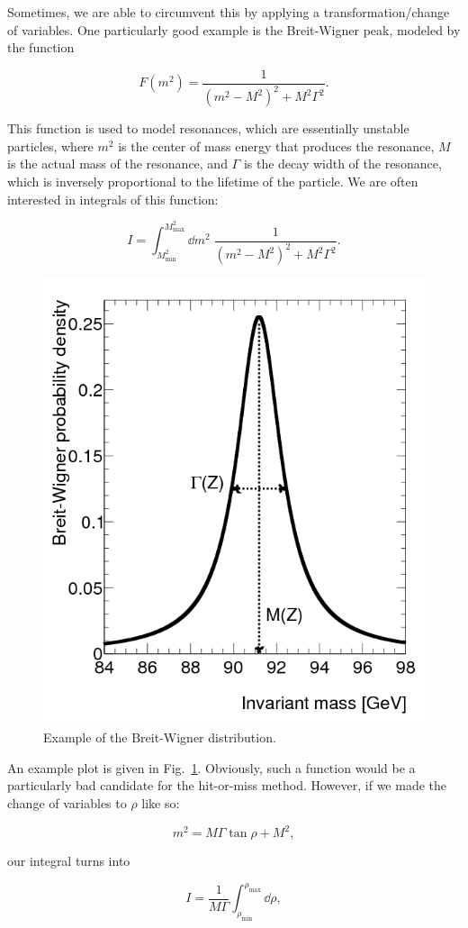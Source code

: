 Sometimes, we are able to circumvent this by applying a transformation/change of variables. One particularly good example is the Breit-Wigner peak, modeled by the function

\begin{equation}
  F(m^2) = \frac{1}{(m^2 - M^2)^2 + M^2\Gamma^2}.
\end{equation}

This function is used to model resonances, which are essentially unstable particles, where $m^2$ is the center of mass energy that produces the resonance, $M$ is the actual mass of the resonance, and $\Gamma$ is the decay width of the resonance, which is inversely proportional to the lifetime of the particle. We are often interested in integrals of this function:

\begin{equation}
  I = \int_{M_{\mathrm{min}}^2}^{M_{\mathrm{max}}^2} \dd m^2 \; \frac{1}{(m^2 - M^2)^2 + M^2\Gamma^2}.
\end{equation}


\begin{figure}[ht]
  \centering
  
  \includegraphics[width=0.4\linewidth]{./res/Images/breit-wigner.png}

  \caption{Example of the Breit-Wigner distribution.}
  \label{fig:BreitWigner}
\end{figure}


An example plot is given in Fig.~\ref{fig:BreitWigner}. Obviously, such a function would be a particularly bad candidate for the hit-or-miss method. However, if we made the change of variables to $\rho$ like so:

\begin{equation}
  m^2 = M\Gamma\tan\rho + M^2,
\end{equation}

our integral turns into

\begin{equation}
  I = \frac{1}{M\Gamma} \int_{\rho_{\mathrm{min}}}^{\rho_{\mathrm{max}}} \dd\rho,
\end{equation}

